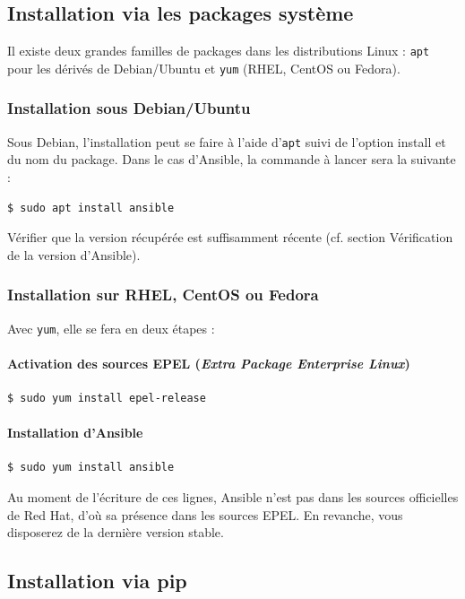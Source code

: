 \documentclass[hidelinks]{article}
\begin{document}
\subsection{Installation via les packages système}
Il existe deux grandes familles de packages dans les distributions Linux : \texttt{apt} pour les dérivés de Debian/Ubuntu et \texttt{yum} (RHEL, CentOS ou Fedora).
\subsubsection{Installation sous Debian/Ubuntu}
Sous Debian, l'installation peut se faire à l'aide d'\texttt{apt} suivi de l'option install et du nom du package. Dans le cas d'Ansible, la commande à lancer sera la suivante :
\begin{verbatim}
$ sudo apt install ansible
\end{verbatim}

Vérifier que la version récupérée est suffisamment récente (cf. section Vérification de la version d'Ansible).

\subsubsection{Installation sur RHEL, CentOS ou Fedora}
Avec \texttt{yum}, elle se fera en deux étapes :

\paragraph{Activation des sources EPEL (\textit{Extra Package Enterprise Linux})}
\begin{verbatim}
$ sudo yum install epel-release
\end{verbatim}

\paragraph{Installation d'Ansible}
\begin{verbatim}
$ sudo yum install ansible
\end{verbatim}

Au moment de l'écriture de ces lignes, Ansible n'est pas dans les sources officielles de Red Hat, d'où sa présence dans les sources EPEL. En revanche, vous disposerez de la dernière version stable.

\subsection{Installation via pip}
\label{subsec:Installation via pip}
\end{document}
